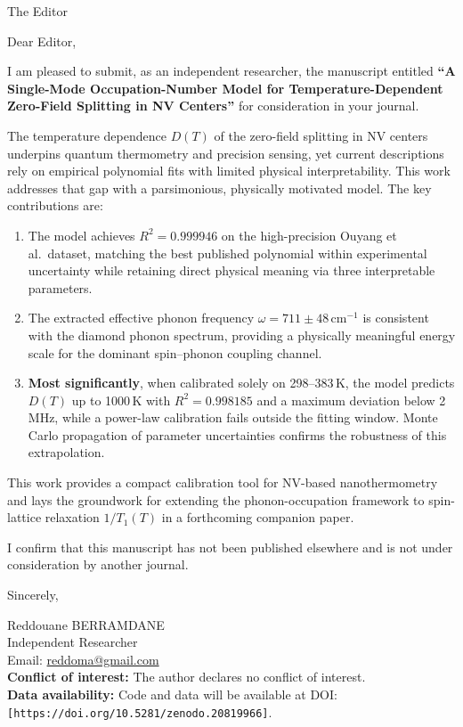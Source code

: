 \documentclass[12pt]{letter}
\begin{document}
\begin{letter}{The Editor}

\opening{Dear Editor,}

I am pleased to submit, as an independent researcher, the manuscript
entitled \textbf{``A Single-Mode Occupation-Number Model for
Temperature-Dependent Zero-Field Splitting in NV Centers''} for
consideration in your journal.

The temperature dependence $D(T)$ of the zero-field splitting in
NV centers underpins quantum thermometry and precision sensing, yet
current descriptions rely on empirical polynomial fits with limited
physical interpretability. This work addresses that gap with a
parsimonious, physically motivated model. The key contributions are:

\begin{enumerate}
    \item The model achieves $R^2 = 0.999946$ on the high-precision
    Ouyang et al.\ dataset, matching the best published polynomial
    within experimental uncertainty while retaining direct physical
    meaning via three interpretable parameters.

    \item The extracted effective phonon frequency
    $\omega = 711 \pm 48$\,cm$^{-1}$ is consistent with the diamond
    phonon spectrum, providing a physically meaningful energy scale
    for the dominant spin--phonon coupling channel.

    \item \textbf{Most significantly}, when calibrated solely on
    298--383\,K, the model predicts $D(T)$ up to 1000\,K with
    $R^2 = 0.998185$ and a maximum deviation below 2\,MHz, while
    a power-law calibration fails outside the fitting window.
    Monte Carlo propagation of parameter uncertainties confirms
    the robustness of this extrapolation.
\end{enumerate}

This work provides a compact calibration tool for NV-based
nanothermometry and lays the groundwork for extending the
phonon-occupation framework to spin-lattice relaxation
$1/T_1(T)$ in a forthcoming companion paper.

I confirm that this manuscript has not been published elsewhere
and is not under consideration by another journal.

\closing{Sincerely,}

Reddouane BERRAMDANE\\
Independent Researcher\\
Email: \href{mailto:reddoma@gmail.com}{reddoma@gmail.com}\\[0.8em]
\textbf{Conflict of interest:} The author declares no conflict of interest.\\
\textbf{Data availability:} Code and data will be available at
DOI: \texttt{[https://doi.org/10.5281/zenodo.20819966]}.

\end{letter}
\end{document}
